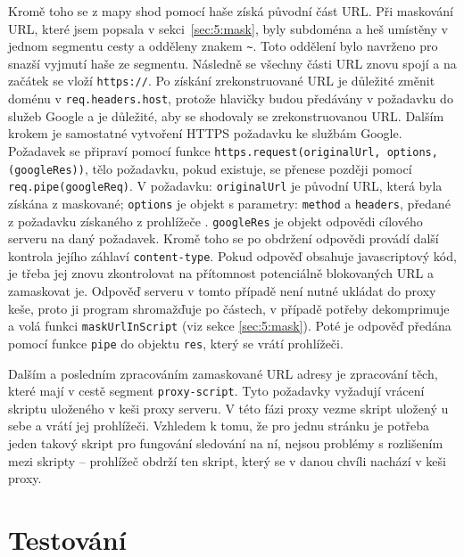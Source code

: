 Kromě toho se z mapy shod pomocí haše získá původní část URL. Při maskování URL, které jsem popsala v sekci~\ref{sec:5:mask}, byly subdoména a heš umístěny v jednom segmentu cesty a odděleny znakem \verb|~|. Toto oddělení bylo navrženo pro snazší vyjmutí haše ze segmentu. Následně se všechny části URL znovu spojí a na začátek se vloží \texttt{https://}. Po získání zrekonstruované URL je důležité změnit doménu v \texttt{req.headers.host}, protože hlavičky budou předávány v požadavku do služeb Google a je důležité, aby se shodovaly se zrekonstruovanou URL. Dalším krokem je samostatné vytvoření HTTPS požadavku ke službám Google. Požadavek se připraví pomocí funkce \texttt{https.request(originalUrl, options, (googleRes))}, tělo požadavku, pokud existuje, se přenese později pomocí \texttt{req.pipe(googleReq)}. V požadavku: \texttt{originalUrl} je původní URL, která byla získána z maskované; \texttt{options}  je objekt s parametry: \texttt{method} a \texttt{headers}, předané z požadavku získaného z prohlížeče \cite{https}. \texttt{googleRes} je objekt odpovědi cílového serveru na daný požadavek. Kromě toho se po obdržení odpovědi provádí další kontrola jejího záhlaví \texttt{content-type}. Pokud odpověď obsahuje javascriptový kód, je třeba jej znovu zkontrolovat na přítomnost potenciálně blokovaných URL a zamaskovat je. Odpověď serveru v tomto případě není nutné ukládat do proxy keše, proto ji program shromažďuje po částech, v případě potřeby dekomprimuje a volá funkci \texttt{maskUrlInScript} (viz sekce \ref{sec:5:mask}). Poté je odpověď předána pomocí funkce \texttt{pipe} do objektu \texttt{res}, který se vrátí prohlížeči.

Dalším a posledním zpracováním zamaskované URL adresy je zpracování těch, které mají v cestě segment \texttt{proxy-script}. Tyto požadavky vyžadují vrácení skriptu uloženého v keši proxy serveru. V této fázi proxy vezme skript uložený u sebe a vrátí jej prohlížeči. Vzhledem k tomu, že pro jednu stránku je potřeba jeden takový skript pro fungování sledování na ní, nejsou problémy s rozlišením mezi skripty -- prohlížeč obdrží ten skript, který se v danou chvíli nachází v keši proxy.

\chapter{Testování}
\label{ch:6}

